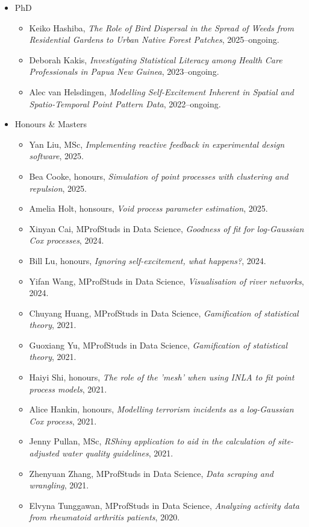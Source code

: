 \documentclass[10pt,a4paper]{moderncv}
\begin{document}
\begin{itemize}
\item PhD
  \begin{itemize}
  \item Keiko Hashiba, \textit{The Role of Bird Dispersal in the Spread of Weeds from Residential Gardens to Urban Native Forest Patches}, 2025--ongoing.
  \item Deborah Kakis, \textit{Investigating Statistical Literacy among Health Care Professionals in Papua New Guinea}, 2023--ongoing.
  \item Alec van Helsdingen, \textit{Modelling Self-Excitement Inherent in Spatial and Spatio-Temporal Point Pattern Data}, 2022--ongoing.
  \end{itemize}
\item Honours \& Masters
  \begin{itemize}
  \item Yan Liu, MSc, \textit{Implementing reactive feedback in experimental design software}, 2025.
  \item Bea Cooke, honours, \textit{Simulation of point processes with clustering and repulsion}, 2025.
    \item Amelia Holt, honsours, \textit{Void process parameter estimation}, 2025.
  \item Xinyan Cai, MProfStuds in Data Science, \textit{Goodness of fit for log-Gaussian Cox processes}, 2024.
  \item Bill Lu, honours, \textit{Ignoring self-excitement, what happens?}, 2024.
  \item Yifan Wang, MProfStuds in Data Science, \textit{Visualisation of river networks}, 2024.
  \item Chuyang Huang, MProfStuds in Data Science, \textit{Gamification of statistical theory}, 2021.
  \item Guoxiang Yu, MProfStuds in Data Science, \textit{Gamification of statistical theory}, 2021.
  \item Haiyi Shi, honours, \textit{The role of the 'mesh' when using INLA to fit point process models}, 2021.
  \item Alice Hankin, honours, \textit{Modelling terrorism incidents as a log-Gaussian Cox process}, 2021.
  \item Jenny Pullan, MSc, \textit{RShiny application to aid in the calculation of site-adjusted water quality guidelines}, 2021.
  \item Zhenyuan Zhang, MProfStuds in Data Science, \textit{Data scraping and wrangling}, 2021.
  \item Elvyna Tunggawan, MProfStuds in Data Science, \textit{Analyzing activity data from rheumatoid arthritis patients}, 2020.

\end{itemize}
\end{itemize}
\end{document}
